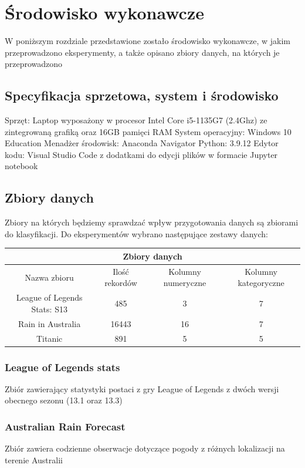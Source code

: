 \documentclass{book}
\begin{document}
\chapter{Środowisko wykonawcze}

W poniższym rozdziale przedstawione zostało środowisko wykonawcze, 
w jakim przeprowadzono eksperymenty, a także opisano zbiory danych, 
na których je przeprowadzono
\section{Specyfikacja sprzetowa, system i środowisko}
Sprzęt: Laptop wyposażony w procesor Intel Core i5-1135G7 
(2.4Ghz) ze zintegrowaną grafiką oraz 16GB pamięci RAM
System operacyjny: Windows 10 Education
Menadżer środowisk: Anaconda Navigator
Python: 3.9.12
Edytor kodu: Visual Studio Code z dodatkami do edycji plików w 
formacie Jupyter notebook
\section{Zbiory danych}
Zbiory na których będziemy sprawdzać wpływ przygotowania danych 
są zbiorami do klasyfikacji. Do eksperymentów wybrano następujące 
zestawy danych:

\begin{center}
    \begin{tabular}{ |c|c|c|c| } 
    \hline
    \multicolumn{4}{|c|}{Zbiory danych} \\
    \hline
    Nazwa zbioru & Ilość rekordów & Kolumny numeryczne & Kolumny kategoryczne \\
     \hline
     League of Legends Stats: S13\cite{lol_stats_dataset} & 485 & 3 & 7\\ 
     Rain in Australia\cite{australian_rain_dataset} & 16443 & 16 & 7\\ 
     Titanic\cite{titanic_dataset} & 891 & 5 & 5\\ 
     \hline
    \end{tabular}
    \end{center}
\subsection{League of Legends stats}
Zbiór zawierający statystyki postaci z gry League of Legends z 
dwóch wersji obecnego sezonu (13.1 oraz 13.3)
\subsection{Australian Rain Forecast}
Zbiór zawiera codzienne obserwacje dotyczące pogody z różnych 
lokalizacji na terenie Australii
\end{document}
